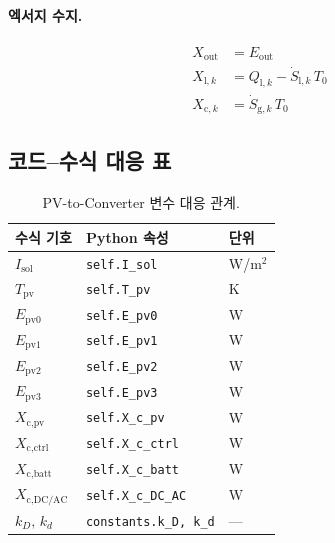 \paragraph{엑서지 수지.}
\begin{align}
  X_\text{out}        &= E_\text{out}                                       \label{eq:pv-generic-Xout}  \\
  X_{\text{l},k}      &= Q_{\text{l},k} - \dot{S}_{\text{l},k}\,T_0       \label{eq:pv-generic-Xl}    \\
  X_{\text{c},k}      &= \dot{S}_{\text{g},k}\,T_0                         \label{eq:pv-generic-Xc}
\end{align}

\subsection{코드--수식 대응 표}

\begin{table}[h!]
\centering
\caption{PV-to-Converter 변수 대응 관계.}
\label{tab:pv-mapping}
\begin{tabular}{@{}lll@{}}
\toprule
수식 기호 & Python 속성 & 단위 \\
\midrule
$I_\text{sol}$         & \texttt{self.I\_sol}       & W/m$^2$ \\
$T_\text{pv}$          & \texttt{self.T\_pv}        & K       \\
$E_\text{pv0}$         & \texttt{self.E\_pv0}       & W       \\
$E_\text{pv1}$         & \texttt{self.E\_pv1}       & W       \\
$E_\text{pv2}$         & \texttt{self.E\_pv2}       & W       \\
$E_\text{pv3}$         & \texttt{self.E\_pv3}       & W       \\
$X_\text{c,pv}$        & \texttt{self.X\_c\_pv}     & W       \\
$X_\text{c,ctrl}$      & \texttt{self.X\_c\_ctrl}   & W       \\
$X_\text{c,batt}$      & \texttt{self.X\_c\_batt}   & W       \\
$X_\text{c,DC/AC}$     & \texttt{self.X\_c\_DC\_AC} & W       \\
$k_D,\,k_d$            & \texttt{constants.k\_D, k\_d} & --- \\
\bottomrule
\end{tabular}
\end{table}
